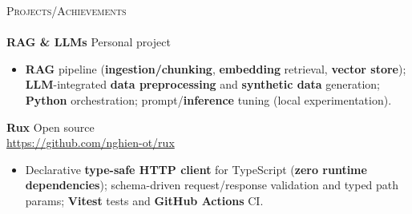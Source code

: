 \documentclass[a4paper]{article}
\newcommand{\lineunder} {
 \vspace*{-8pt} \\
 \hspace*{-18pt} \hrulefill \\
}
\newcommand{\header} [1] {
 {\hspace*{-18pt}\vspace*{6pt} \textsc{#1}}
 \vspace*{-6pt} \lineunder
}
\begin{document}
\header{Projects/Achievements}
{\textbf{RAG \& LLMs}} \hfill Personal project \\
\vspace{-3mm}
\begin{itemize}
      \item \textbf{RAG} pipeline (\textbf{ingestion/chunking}, \textbf{embedding} retrieval, \textbf{vector store}); \textbf{LLM}-integrated \textbf{data preprocessing} and \textbf{synthetic data} generation; \textbf{Python} orchestration; prompt/\textbf{inference} tuning (local experimentation).
\end{itemize}
\vspace{-2.5mm}
{\textbf{Rux}} \hfill Open source \\
\vspace{-1mm}
\url{https://github.com/nghien-ot/rux} \\
\vspace{-1.5mm}
\begin{itemize}
      \item Declarative \textbf{type-safe HTTP client} for TypeScript (\textbf{zero runtime dependencies}); schema-driven request/response validation and typed path params; \textbf{Vitest} tests and \textbf{GitHub Actions} CI.
\end{itemize}
\vspace{-2mm}
\end{document}

